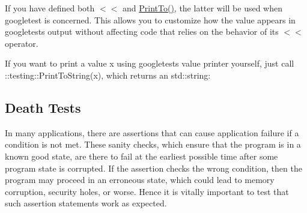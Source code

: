\begin{DoxyCode}{0}
\DoxyCodeLine{}
\DoxyCodeLine{}
\DoxyCodeLine{  \}}
\DoxyCodeLine{\};}
\DoxyCodeLine{}
\DoxyCodeLine{\}}
\DoxyCodeLine{}
\end{DoxyCode}


If you have defined both {\ttfamily $<$$<$} and {\ttfamily \mbox{\hyperlink{namespacetesting_1_1internal_a8fd10cc30084c36a89c74868c8bd53f8}{Print\+To()}}}, the latter will be used when googletest is concerned. This allows you to customize how the value appears in googletest\textquotesingle{}s output without affecting code that relies on the behavior of its {\ttfamily $<$$<$} operator.

If you want to print a value {\ttfamily x} using googletest\textquotesingle{}s value printer yourself, just call {\ttfamily \+::testing\+::\+Print\+To\+String(x)}, which returns an {\ttfamily std\+::string}\+:


\begin{DoxyCode}{0}
\DoxyCodeLine{}
\end{DoxyCode}


\subsection*{Death Tests}

In many applications, there are assertions that can cause application failure if a condition is not met. These sanity checks, which ensure that the program is in a known good state, are there to fail at the earliest possible time after some program state is corrupted. If the assertion checks the wrong condition, then the program may proceed in an erroneous state, which could lead to memory corruption, security holes, or worse. Hence it is vitally important to test that such assertion statements work as expected.

